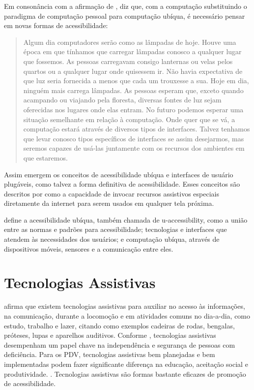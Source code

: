 \documentclass[english,brazilian]{UNISINOSmonografia}
\begin{document}
Em consonância com a afirmação de ,  diz que, com a computação substituindo o paradigma de computação pessoal para computação ubíqua, é necessário pensar em novas formas de acessibilidade:

\begin{quote}
	Algum dia computadores serão como as lâmpadas de hoje. Houve uma época em que tínhamos que carregar lâmpadas conosco a qualquer lugar que fossemos. As pessoas carregavam consigo lanternas ou velas pelos quartos ou a qualquer lugar onde quisessem ir. Não havia expectativa de que luz seria fornecida a menos que cada um trouxesse a sua. Hoje em dia, ninguém mais carrega lâmpadas. As pessoas esperam que, exceto quando acampando ou viajando pela floresta, diversas fontes de luz sejam oferecidas nos lugares onde elas entram. No futuro podemos esperar uma situação semelhante em relação à computação. Onde quer que se vá, a computação estará através de diversos tipos de interfaces. Talvez tenhamos que levar conosco tipos específicos de interfaces se assim desejarmos, mas seremos capazes de usá-las juntamente com os recursos dos ambientes em que estaremos. \cite{vanderheiden2008ubiquitous}
\end{quote}

Assim emergem os conceitos de acessibilidade ubíqua e interfaces de usuário plugáveis, como talvez a forma definitiva de acessibilidade. Esses conceitos são descritos por  como a capacidade de invocar recursos assistivos especiais diretamente da internet para serem usados em qualquer tela próxima.

 define a acessibilidade ubíqua, também chamada de u-accessibility, como a união entre as normas e padrões para acessibilidade; tecnologias e interfaces que atendem às necessidades dos usuários; e computação ubíqua, através de dispositivos móveis, sensores e a comunicação entre eles.

	\section{Tecnologias Assistivas}
 afirma que existem tecnologias assistivas para auxiliar no acesso às informações, na comunicação, durante a locomoção e em atividades comuns no dia-a-dia, como estudo, trabalho e lazer, citando como exemplos cadeiras de rodas, bengalas, próteses, lupas e aparelhos auditivos. Conforme , tecnologias assistivas desempenham um papel chave na independência e segurança de pessoas com deficiência. Para os PDV, tecnologias assistivas bem planejadas e bem implementadas podem fazer significante diferença na educação, aceitação social e produtividade. \cite{dias2015navpal}. Tecnologias assistivas são formas bastante eficazes de promoção de acessibilidade.
\end{document}
